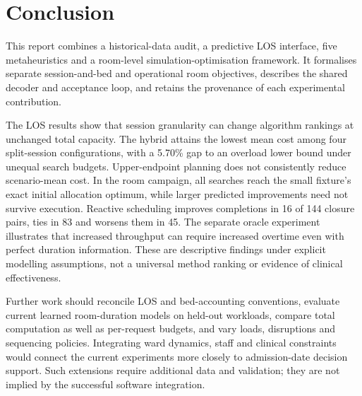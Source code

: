 \section{Conclusion}
\label{sec:conclusion}

This report combines a historical-data audit, a predictive LOS interface,
five metaheuristics and a room-level simulation-optimisation framework.
It formalises separate session-and-bed and operational room objectives,
describes the shared decoder and acceptance loop, and retains the provenance
of each experimental contribution.

The LOS results show that session granularity can change algorithm rankings
at unchanged total capacity. The hybrid attains the lowest mean cost among
four split-session configurations, with a 5.70\% gap to an overload lower
bound under unequal search budgets. Upper-endpoint planning does not
consistently reduce scenario-mean cost. In the room campaign, all searches
reach the small fixture's exact initial allocation optimum, while larger
predicted improvements need not survive execution. Reactive scheduling
improves completions in 16 of 144 closure pairs, ties in 83 and worsens them
in 45. The separate oracle experiment illustrates that increased throughput
can require increased overtime even with perfect duration information.
These are descriptive findings under explicit modelling assumptions, not
a universal method ranking or evidence of clinical effectiveness.

Further work should reconcile LOS and bed-accounting conventions, evaluate
current learned room-duration models on held-out workloads, compare total
computation as well as per-request budgets, and vary loads, disruptions and
sequencing policies. Integrating ward dynamics, staff and clinical constraints
would connect the current experiments more closely to admission-date decision
support. Such extensions require additional data and validation; they are
not implied by the successful software integration.
